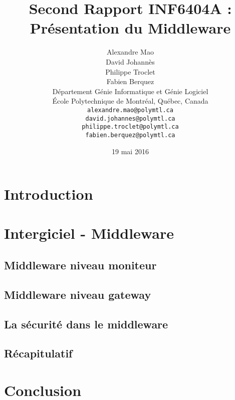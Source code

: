 \documentclass{article}
\title{Second Rapport INF6404A : Présentation du Middleware}
\author{
	Alexandre Mao\\
	David Johannès \\
	Philippe Troclet \\
	Fabien Berquez \\
	D\'{e}partement G\'{e}nie Informatique et G\'{e}nie Logiciel \\
	\'{E}cole Polytechnique de Montr\'{e}al, Qu\'{e}bec, Canada \\
	\texttt{alexandre.mao@polymtl.ca}\\
	\texttt{david.johannes@polymtl.ca}\\
	\texttt{philippe.troclet@polymtl.ca}   \\
	\texttt{fabien.berquez@polymtl.ca}   \\
}
\date{19 mai 2016}
\begin{document}
\maketitle

\section{Introduction}


\section{Intergiciel - Middleware}
\subsection{Middleware niveau moniteur}

\subsection{Middleware niveau gateway}

\subsection{La sécurité dans le middleware}

\subsection{Récapitulatif}


%

\section{ Conclusion }

 







\end{document}
